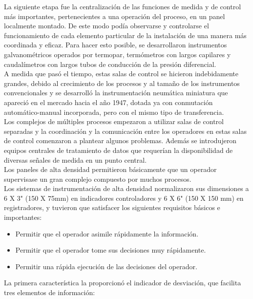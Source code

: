 \documentclass[12pt,letterpaper, onecolumn, titlepage, oneside]{book}
\begin{document}
 La siguiente etapa fue la centralización de las funciones de medida y de control más importantes, pertenecientes a una operación del proceso, en un panel localmente montado. De este modo podía observarse y controlarse el funcionamiento de cada elemento particular de la instalación de una manera
más coordinada y eficaz. Para hacer esto posible, se desarrollaron instrumentos galvanométricos operados por termopar, termómetros con largos capilares y caudalímetros con largos tubos de conducción de la presión diferencial.\\

A medida que pasó el tiempo, estas salas de control se hicieron indebidamente grandes, debido al crecimiento de los procesos y al tamaño de los instrumentos convencionales y se desarrolló la instrumentación neumática miniatura que apareció en el mercado hacia el año 1947, dotada ya con conmutación automático-manual incorporada, pero con el mismo tipo de transferencia.\\

Los complejos de múltiples procesos empezaron a utilizar salas de control separadas y la coordinación y la comunicación entre los operadores en estas salas de control comenzaron a plantear algunos problemas. Además se introdujeron equipos centrales de tratamiento de datos que requerían la disponibilidad de diversas señales de medida en un punto central. \\

Los paneles de alta densidad permitieron básicamente que un operador supervisase un gran complejo compuesto por muchos procesos.\\

Los sistemas de instrumentación de alta densidad normalizaron sus dimensiones a 6 X 3" (150 X 75mm) en indicadores controladores y 6 X 6" (150 X 150 mm) en registradores, y tuvieron que satisfacer los siguientes requisitos básicos e importantes:\\

\begin{itemize}
    \item Permitir que el operador asimile rápidamente la información.
    \item Permitir que el operador tome sus decisiones muy rápidamente.
    \item Permitir una rápida ejecución de las decisiones del operador. 
\end{itemize}

La primera característica la proporcionó el indicador de desviación, que facilita tres elementos de información:\\
\end{document}
